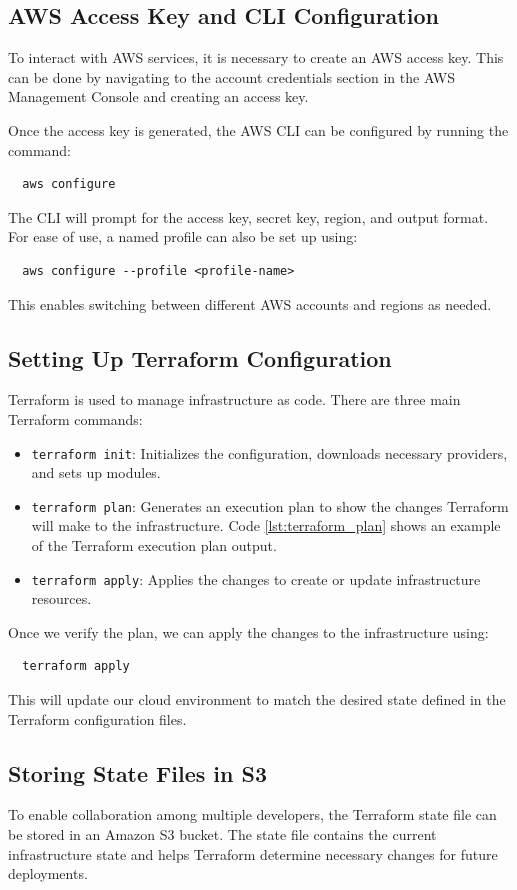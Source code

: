 \subsection{AWS Access Key and CLI Configuration}
To interact with AWS services, it is necessary to create an AWS access key. This can be done by navigating to the account credentials section in the AWS Management Console and creating an access key.

Once the access key is generated, the AWS CLI can be configured by running the command:
\begin{verbatim}
  aws configure
\end{verbatim}
The CLI will prompt for the access key, secret key, region, and output format. For ease of use, a named profile can also be set up using:
\begin{verbatim}
  aws configure --profile <profile-name>
\end{verbatim}
This enables switching between different AWS accounts and regions as needed.

\subsection{Setting Up Terraform Configuration}
Terraform is used to manage infrastructure as code. There are three main Terraform commands:
\begin{itemize}
    \item \texttt{terraform init}: Initializes the configuration, downloads necessary providers, and sets up modules.
    \item \texttt{terraform plan}: Generates an execution plan to show the changes Terraform will make to the infrastructure. Code \ref{lst:terraform_plan} shows an example of the Terraform execution plan output.
    \item \texttt{terraform apply}: Applies the changes to create or update infrastructure resources.
\end{itemize}

Once we verify the plan, we can apply the changes to the infrastructure using: 
\begin{verbatim}
  terraform apply
\end{verbatim}

This will update our cloud environment to match the desired state defined in the Terraform configuration files.


\subsection{Storing State Files in S3}
To enable collaboration among multiple developers, the Terraform state file can be stored in an Amazon S3 bucket. The state file contains the current infrastructure state and helps Terraform determine necessary changes for future deployments.


